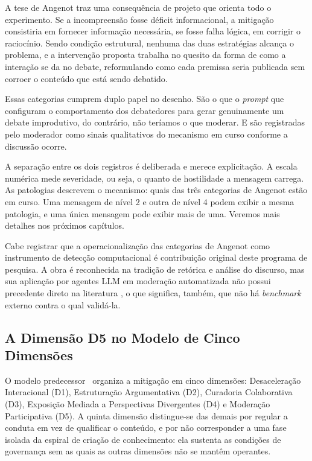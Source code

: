 \documentclass[conference]{IEEEtran} \IEEEoverridecommandlockouts %
\begin{document}
A tese de Angenot traz uma consequência de projeto que orienta todo o
experimento. Se a incompreensão fosse déficit informacional, a mitigação
consistiria em fornecer informação necessária, se fosse falha lógica, em corrigir o
raciocínio. Sendo condição estrutural, nenhuma das duas estratégias alcança o
problema, e a intervenção proposta trabalha no quesito da forma de como a interação se da no debate, reformulando como cada premissa seria publicada sem corroer o conteúdo que
está sendo debatido.

Essas categorias cumprem duplo papel no desenho. São o que o \textit{prompt} que 
configuram o comportamento dos debatedores para gerar genuinamente um debate improdutivo, 
do contrário, não teríamos o que moderar. E são registradas pelo moderador como sinais qualitativos do mecanismo em curso conforme a discussão ocorre.

A separação entre os dois registros é deliberada e merece explicitação. A
escala numérica mede severidade, ou seja, o quanto de hostilidade a mensagem
carrega. As patologias descrevem o mecanismo: quais das três categorias de Angenot estão em curso. Uma mensagem de nível 2 e outra de nível 4 podem
exibir a mesma patologia, e uma única mensagem pode exibir mais de uma. Veremos mais detalhes nos próximos capítulos.

Cabe registrar que a operacionalização das categorias de Angenot como
instrumento de detecção computacional é contribuição original deste programa de
pesquisa. A obra é reconhecida na tradição de retórica e análise do discurso,
mas sua aplicação por agentes LLM em moderação automatizada não possui
precedente direto na literatura , o que significa, também, que não há
\textit{benchmark} externo contra o qual validá-la.

\subsection{A Dimensão D5 no Modelo de Cinco Dimensões}

O modelo predecessor~\cite{moura2026hostility} organiza a mitigação em cinco
dimensões: Desaceleração Interacional (D1), Estruturação Argumentativa (D2),
Curadoria Colaborativa (D3), Exposição Mediada a Perspectivas Divergentes (D4)
e Moderação Participativa (D5). A quinta dimensão distingue-se das demais por
regular a conduta em vez de qualificar o conteúdo, e por não corresponder a uma
fase isolada da espiral de criação de conhecimento: ela sustenta as condições
de governança sem as quais as outras dimensões não se mantêm operantes. 
\end{document}
